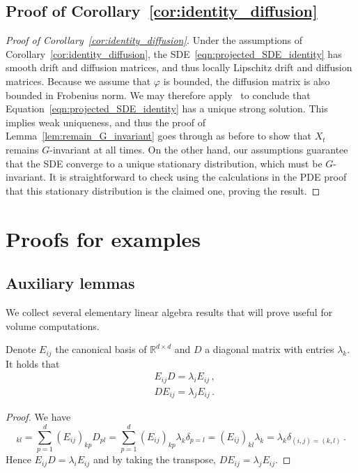 \documentclass[twoside,a4paper,11pt]{article}
\renewcommand{\phi}{\varphi}
\theoremstyle{plain}
\begin{document}
\subsection{Proof of Corollary~\ref{cor:identity_diffusion}}
\begin{proof}[Proof of Corollary~\ref{cor:identity_diffusion}]
Under the assumptions of Corollary~\ref{cor:identity_diffusion},
the SDE~\eqref{eqn:projected_SDE_identity} 
has smooth drift and diffusion matrices,
and thus locally Lipschitz drift and diffusion matrices.
Because we assume that $\phi$ is bounded,
the diffusion matrix is also bounded in Frobenius
norm.
We may therefore apply~\cite[Proposition 4.2.4]{kunze2012sde}
to conclude that Equation~\eqref{eqn:projected_SDE_identity}
has a unique
strong solution.
This implies weak uniqueness,
and thus the proof
of Lemma~\ref{lem:remain_G_invariant} goes through as before to show that $X_t$ remains
$G$-invariant at all times.
On the other hand, our assumptions guarantee
that the SDE
converge to a unique stationary distribution, 
which must be $G$-invariant.
It is straightforward to check using
the calculations in the PDE proof that this
stationary distribution is the claimed one,
proving the result.
\end{proof}

\section{Proofs for examples}
\label{sec:examples}

\subsection{Auxiliary lemmas}

We collect several elementary linear algebra results that will prove useful for volume computations.



\begin{lemma}
\label{lemma:prod_diagonal}
    Denote $E_{ij}$ the canonical basis of $\mathbb{R}^{d\times d}$ and $D$ a diagonal matrix with entries $\lambda_k$. It holds that
    \begin{align*}
        & E_{ij}D = \lambda_i E_{ij}\, , \\
        & D E_{ij} = \lambda_j E_{ij} \, .
    \end{align*}
    
\end{lemma}

\begin{proof}
    We have
    \begin{equation*}
     [E_{ij}D ]_{kl} = \sum_{p=1}^d (E_{ij})_{kp} D_{pl} 
      = \sum_{p=1}^d (E_{ij})_{kp} \lambda_k \delta_{p=l} = (E_{ij})_{kl} \lambda_k  = \lambda_k \delta_{(i,j) = (k,l)} \, .
    \end{equation*}
  Hence $E_{ij}D = \lambda_i E_{ij}$  and by taking the transpose, $D E_{ij} = \lambda_j E_{ij}$.
\end{proof}
\end{document}
